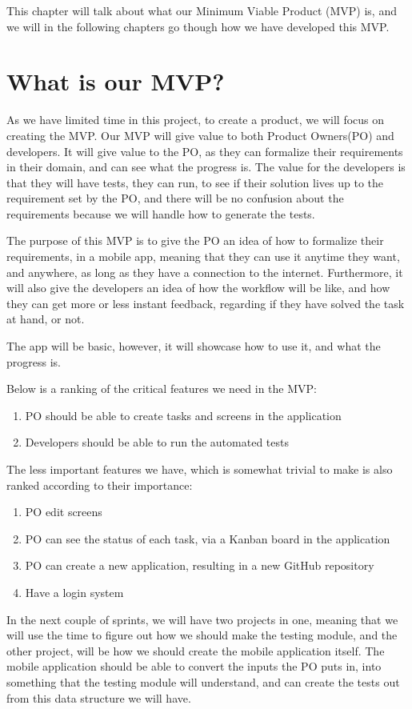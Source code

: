 This chapter will talk about what our Minimum Viable Product (MVP) is, and we will in the following chapters go though how we have developed this MVP.

\section{What is our MVP?}
As we have limited time in this project, to create a product, we will focus on creating the MVP.
Our MVP will give value to both Product Owners(PO) and developers.
It will give value to the PO, as they can formalize their requirements in their domain, and can see what the progress is.
The value for the developers is that they will have tests, they can run, to see if their solution lives up to the requirement set by the PO, and there will be no confusion about the requirements because we will handle how to generate the tests. 

The purpose of this MVP is to give the PO an idea of how to formalize their requirements, in a mobile app, meaning that they can use it anytime they want, and anywhere, as long as they have a connection to the internet.
Furthermore, it will also give the developers an idea of how the workflow will be like, and how they can get more or less instant feedback, regarding if they have solved the task at hand, or not. 

The app will be basic, however, it will showcase how to use it, and what the progress is.

Below is a ranking of the critical features we need in the MVP:

\begin{enumerate}
    \item PO should be able to create tasks and screens in the application
    \item Developers should be able to run the automated tests
\end{enumerate}

The less important features we have, which is somewhat trivial to make is also ranked according to their importance:

\begin{enumerate}
    \item PO edit screens
    \item PO can see the status of each task, via a Kanban board in the application
    \item PO can create a new application, resulting in a new GitHub repository
    \item Have a login system
\end{enumerate}

In the next couple of sprints, we will have two projects in one, meaning that we will use the time to figure out how we should make the testing module, and the other project, will be how we should create the mobile application itself.
The mobile application should be able to convert the inputs the PO puts in, into something that the testing module will understand, and can create the tests out from this data structure we will have.
